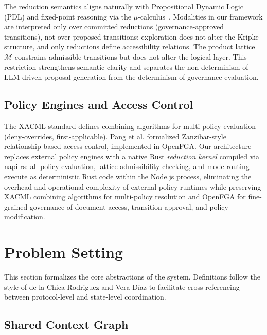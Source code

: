 \documentclass[11pt]{article}
\begin{document}
The reduction semantics aligns naturally with Propositional Dynamic Logic (PDL) and fixed-point reasoning via the $\mu$-calculus~\cite{kozen1983}. Modalities in our framework are interpreted only over committed reductions (governance-approved transitions), not over proposed transitions: exploration does not alter the Kripke structure, and only reductions define accessibility relations. The product lattice $\mathcal{M}$ constrains admissible transitions but does not alter the logical layer. This restriction strengthens semantic clarity and separates the non-determinism of LLM-driven proposal generation from the determinism of governance evaluation.

\subsection{Policy Engines and Access Control}

The XACML standard \cite{xacml2013} defines combining algorithms for multi-policy evaluation (deny-overrides, first-applicable). Pang et al. \cite{pang2019} formalized Zanzibar-style relationship-based access control, implemented in OpenFGA. Our architecture replaces external policy engines with a native Rust \emph{reduction kernel} compiled via napi-rs: all policy evaluation, lattice admissibility checking, and mode routing execute as deterministic Rust code within the Node.js process, eliminating the overhead and operational complexity of external policy runtimes while preserving XACML combining algorithms for multi-policy resolution and OpenFGA for fine-grained governance of document access, transition approval, and policy modification.

\section{Problem Setting}
\label{sec:problem-setting}

This section formalizes the core abstractions of the system. Definitions follow the style of de la Chica Rodriguez and Vera D\'{i}az \cite{delachica2026} to facilitate cross-referencing between protocol-level and state-level coordination.

\subsection{Shared Context Graph}
\end{document}

